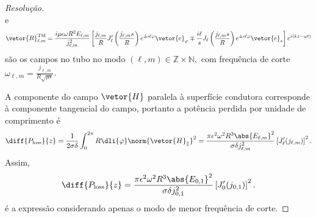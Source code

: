 \begin{proof}[Resolução]
\begin{equation*}
    \end{equation*}
    e
    \begin{equation*}
        \vetor{B}^\mathrm{TM}_{\ell, m} = \frac{i \mu \epsilon \omega R^2 E_{\ell, m}}{j_{\ell,m}^2}\left[\frac{j_{\ell, m}}{R} J_\ell'\left(\frac{j_{\ell,m} s}{R}\right)e^{\pm i \ell \varphi} \vetor{e}_\varphi \mp \frac{i \ell}{s} J_\ell\left(\frac{j_{\ell,m} s}{R}\right)e^{\pm i \ell \varphi}\vetor{e}_s\right] e^{i(kz - \omega t)}
    \end{equation*}
    são os campos no tubo no modo \((\ell, m) \in \mathbb{Z} \times \mathbb{N},\) com frequência de corte \(\omega_{\ell,m} = \frac{j_{\ell,m}}{R\sqrt{\mu \epsilon}}\).

    A componente do campo \(\vetor{H}\) paralela à superfície condutora corresponde à componente tangencial do campo, portanto a potência perdida por unidade de comprimento é
    \begin{equation*}
        \diff{P_\mathrm{loss}}{z} = \frac{1}{2 \sigma \delta} \int_0^{2\pi} R \dli{\varphi} \norm{\vetor{H}_\parallel}^2 = \frac{\pi \epsilon^2 \omega^2 R^3 \abs{E_{\ell,m}}^2}{\sigma \delta j_{\ell, m}^2} \left[J_\ell'(j_{\ell,m})\right]^2.
    \end{equation*}
    Assim, 
    \begin{equation*}
        \diff{P_\mathrm{loss}}{z} = \frac{\pi \epsilon^2 \omega^2 R^3 \abs{E_{0,1}}^2}{\sigma \delta j_{0,1}^2} \left[J_0'(j_{0,1})\right]^2.
    \end{equation*}
    é a expressão considerando apenas o modo de menor frequência de corte.
\end{proof}
